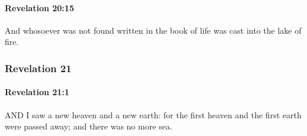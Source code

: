 		\paragraph{Revelation 20:15} %
			\label{REVELATIONNT-20-15}

			And whosoever was not found written in the book of life was cast into the lake of fire.

			\begin{framed}
			\scriptsize
				\begin{compactdesc}
					\item[SBLG] 
				\end{compactdesc}
			\end{framed}

	\subsubsection{Revelation 21} %
		\label{REVELATIONNT-21}
		
		\paragraph{Revelation 21:1} %
			\label{REVELATIONNT-21-1}

			AND I saw a new heaven and a new earth: for the first heaven and the first earth were passed away; and there was no more sea.

